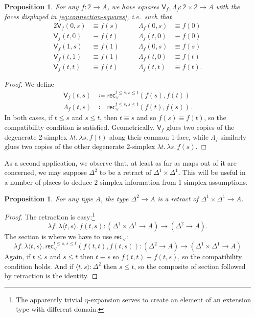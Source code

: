 \documentclass[12pt]{amsart}
\theoremstyle{plain}
\newtheorem{prop}[thm]{Proposition}
\theoremstyle{definition}
\theoremstyle{remark}
\numberwithin{equation}{section}
\newcommand{\jdeq}{\equiv}
\newcommand{\defeq}{\coloneqq}
\newcommand{\pair}[1]{\langle #1\rangle}
\newcommand{\rec}{\mathsf{rec}}
\newcommand{\connmax}[1]{\mathsf{V}_{#1}}
\newcommand{\connmin}[1]{\mathsf{\Lambda}_{#1}}
\newcommand{\lam}[1]{\lambda #1.\,}
\newcommand{\two}{\mathbb{2}}
\begin{document}
\begin{prop}\label{prop:connections}
  For any $f:\two\to A$, we have squares $\connmax f,\connmin f:\two\times\two\to A$ with the faces displayed in \eqref{eq:connection-squares}, i.e.\ such that
  \begin{alignat*}{2}
    \connmax f(0,s) &\jdeq f(s) &\qquad \connmin f(0,s) &\jdeq f(0)\\
    \connmax f(t,0) &\jdeq f(t) &\qquad \connmin f(t,0) &\jdeq f(0)\\
    \connmax f(1,s) &\jdeq f(1) &\qquad \connmin f(0,s) &\jdeq f(s)\\
    \connmax f(t,1) &\jdeq f(1) &\qquad \connmin f(t,0) &\jdeq f(t)\\
    \connmax f(t,t) &\jdeq f(t) &\qquad \connmin f(t,t) &\jdeq f(t).
  \end{alignat*}
\end{prop}
\begin{proof}
  We define
  \begin{align*}
    \connmax f(t,s) &\defeq \rec_\lor^{t\le s, s\le t}(f(s),f(t))\\
    \connmin f(t,s) &\defeq \rec_\lor^{t\le s, s\le t}(f(t),f(s)).
  \end{align*}
  In both cases, if $t\le s$ and $s\le t$, then $t\jdeq s$ and so $f(s)\jdeq f(t)$, so the compatibility condition is satisfied.
  Geometrically, $\connmax f$ glues two copies of the degenerate 2-simplex $\lam{t}\lam{s} f(t)$ along their common 1-face, while $\connmin f$ similarly glues two copies of the other degenerate 2-simplex $\lam{t}\lam{s} f(s)$.
\end{proof}

As a second application, we observe that, at least as far as maps out of it are concerned, we may suppose $\Delta^2$ to be a retract of $\Delta^1\times\Delta^1$.
This will be useful in a number of places to deduce 2-simplex information from 1-simplex assumptions.

\begin{prop}\label{prop:two-simp-as-retract}
  For any type $A$, the type $\Delta^2\to A$ is a retract of $\Delta^1\times\Delta^1\to A$.
\end{prop}
\begin{proof}
  The retraction is easy:\footnote{The apparently trivial $\eta$-expansion serves to create an element of an extension type with different domain.}
  \[ \lam{f} \lam{\pair{t,s}} f(t,s) : (\Delta^1\times\Delta^1\to A) \to (\Delta^2\to A). \]
  The section is where we have to use $\rec_\lor$:
  \[ \lam{f} \lam{\pair{t,s}} \rec_{\lor}^{t\le s,s\le t}(f(t,t),f(t,s)) : (\Delta^2\to A)\to (\Delta^1\times\Delta^1\to A) \]
  Again, if $t\le s$ and $s\le t$ then $t\jdeq s$ so $f(t,t)\jdeq f(t,s)$, so the compatibility condition holds.
  And if $\pair{t,s}:\Delta^2$ then $s\le t$, so the composite of section followed by retraction is the identity.
\end{proof}
\end{document}
